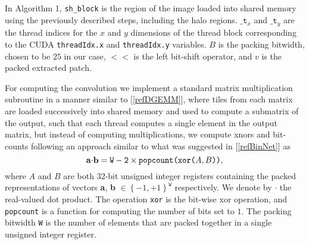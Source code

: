 \documentclass[conference,compsoc]{IEEEtran}
\newcommand{\jani}[1]{\textcolor{red}{\textbf{[Jani: #1]}}}
\newcommand{\response}[1]{\textcolor{darkgreen}{#1}}
\newcommand{\prosaic}[1]{#1}
\begin{document}

In Algorithm 1, \texttt{sh\_block} is the region of the image loaded into shared memory using the previously described steps, including the halo regions. $\texttt{\_t}_x$ and $\texttt{\_t}_y$ are the thread indices for the $x$ and $y$ dimensions of the thread block corresponding to the CUDA \texttt{threadIdx.x} and \texttt{threadIdx.y} variables. $B$ is the packing bitwidth, chosen to be $25$ in our case, $<<$ is the left bit-shift operator, and $v$ is the packed extracted patch.





For computing the convolution we implement a standard matrix multiplication subroutine in a manner similar to [\ref{refDGEMM}], where tiles from each matrix are loaded successively into shared memory and used to compute a submatrix of the output, such that each thread computes a single element in the output matrix, but instead of computing multiplications, we compute xnors and bit-counts following an approach similar to what was suggested in [\ref{refBinNet}] as
\vspace{-1.2mm}
\begin{equation}\label{xnormult}
\vspace{-1.2mm}
         \mathbf{a\cdot}\mathbf{b}= \texttt{W}- \texttt{2}\times \texttt{popcount(xor(}A,B\texttt{))},%
\end{equation}
where ${A}$ and ${B}$ are both 32-bit unsigned integer registers containing the packed representations of vectors \textbf{a}, \textbf{b} $\in \left\lbrace-1,+1\right\rbrace ^{\texttt{W}}$ respectively. We denote by $\cdot$ the real-valued dot product. The operation \texttt{xor} is the bit-wise xor operation, and \texttt{popcount} is a function for computing the number of bits set to $1$. The packing bitwidth \texttt{W} is the number of elements that are packed together in a single unsigned integer register. %
\end{document}
